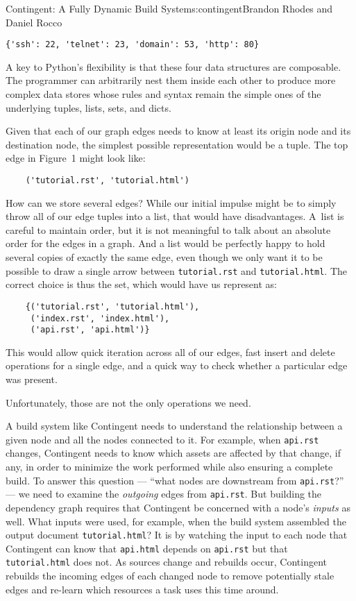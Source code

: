 \begin{aosachapter}{Contingent: A Fully Dynamic Build System}{s:contingent}{Brandon Rhodes and Daniel Rocco}
\begin{verbatim}
{'ssh': 22, 'telnet': 23, 'domain': 53, 'http': 80}
\end{verbatim}

A key to Python's flexibility is that these four data structures are
composable. The programmer can arbitrarily nest them inside each other
to produce more complex data stores whose rules and syntax remain the
simple ones of the underlying tuples, lists, sets, and dicts.

Given that each of our graph edges needs to know at least its origin
node and its destination node, the simplest possible representation
would be a tuple. The top edge in Figure~1 might look like:

\begin{verbatim}
    ('tutorial.rst', 'tutorial.html')
\end{verbatim}

How can we store several edges? While our initial impulse might be to
simply throw all of our edge tuples into a list, that would have
disadvantages. A~list is careful to maintain order, but it is not
meaningful to talk about an absolute order for the edges in a graph. And
a list would be perfectly happy to hold several copies of exactly the
same edge, even though we only want it to be possible to draw a single
arrow between \texttt{tutorial.rst} and \texttt{tutorial.html}. The
correct choice is thus the set, which would have us represent
 as:

\begin{verbatim}
    {('tutorial.rst', 'tutorial.html'),
     ('index.rst', 'index.html'),
     ('api.rst', 'api.html')}
\end{verbatim}

This would allow quick iteration across all of our edges, fast insert
and delete operations for a single edge, and a quick way to check
whether a particular edge was present.

Unfortunately, those are not the only operations we need.

A build system like Contingent needs to understand the relationship
between a given node and all the nodes connected to it. For example,
when \texttt{api.rst} changes, Contingent needs to know which assets are
affected by that change, if any, in order to minimize the work performed
while also ensuring a complete build. To answer this question --- ``what
nodes are downstream from \texttt{api.rst}?'' --- we need to examine the
\emph{outgoing} edges from \texttt{api.rst}. But building the dependency
graph requires that Contingent be concerned with a node's \emph{inputs}
as well. What inputs were used, for example, when the build system
assembled the output document \texttt{tutorial.html}? It is by watching
the input to each node that Contingent can know that \texttt{api.html}
depends on \texttt{api.rst} but that \texttt{tutorial.html} does not. As
sources change and rebuilds occur, Contingent rebuilds the incoming
edges of each changed node to remove potentially stale edges and
re-learn which resources a task uses this time around.


\end{aosachapter}
